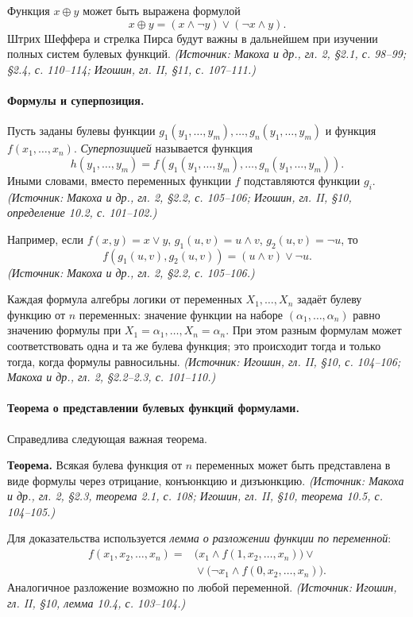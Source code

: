 \documentclass[a4paper,12pt]{article}
\begin{document}
Функция \(x\oplus y\) может быть выражена формулой
\[
x\oplus y=(x\land\neg y)\lor(\neg x\land y).
\]
Штрих Шеффера и стрелка Пирса будут важны в дальнейшем при изучении полных систем булевых функций.
\textit{(Источник: Макоха и др., гл. 2, §2.1, с. 98--99; §2.4, с. 110--114; Игошин, гл. II, §11, с. 107--111.)}

\paragraph{Формулы и суперпозиция.}
Пусть заданы булевы функции \(g_1(y_1,\ldots,y_m),\ldots,g_n(y_1,\ldots,y_m)\) и функция \(f(x_1,\ldots,x_n)\). \emph{Суперпозицией} называется функция
\[
h(y_1,\ldots,y_m)=f(g_1(y_1,\ldots,y_m),\ldots,g_n(y_1,\ldots,y_m)).
\]
Иными словами, вместо переменных функции \(f\) подставляются функции \(g_i\).
\textit{(Источник: Макоха и др., гл. 2, §2.2, с. 105--106; Игошин, гл. II, §10, определение 10.2, с. 101--102.)}

Например, если \(f(x,y)=x\lor y\), \(g_1(u,v)=u\land v\), \(g_2(u,v)=\neg u\), то
\[
f(g_1(u,v),g_2(u,v))=(u\land v)\lor\neg u.
\]
\textit{(Источник: Макоха и др., гл. 2, §2.2, с. 105--106.)}

Каждая формула алгебры логики от переменных \(X_1,\ldots,X_n\) задаёт булеву функцию от \(n\) переменных: значение функции на наборе \((\alpha_1,\ldots,\alpha_n)\) равно значению формулы при \(X_1=\alpha_1,\ldots,X_n=\alpha_n\). При этом разным формулам может соответствовать одна и та же булева функция; это происходит тогда и только тогда, когда формулы равносильны.
\textit{(Источник: Игошин, гл. II, §10, с. 104--106; Макоха и др., гл. 2, §2.2--2.3, с. 101--110.)}

\paragraph{Теорема о представлении булевых функций формулами.}
Справедлива следующая важная теорема.

\textbf{Теорема.} Всякая булева функция от \(n\) переменных может быть представлена в виде формулы через отрицание, конъюнкцию и дизъюнкцию.
\textit{(Источник: Макоха и др., гл. 2, §2.3, теорема 2.1, с. 108; Игошин, гл. II, §10, теорема 10.5, с. 104--105.)}

Для доказательства используется \emph{лемма о разложении функции по переменной}:
\[
\begin{aligned}
f(x_1,x_2,\ldots,x_n)
={}&
\bigl(x_1\land f(1,x_2,\ldots,x_n)\bigr)
\lor{}\\
&{}\lor
\bigl(\neg x_1\land f(0,x_2,\ldots,x_n)\bigr).
\end{aligned}
\]
Аналогичное разложение возможно по любой переменной.
\textit{(Источник: Игошин, гл. II, §10, лемма 10.4, с. 103--104.)}
\end{document}
